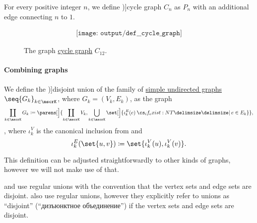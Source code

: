 \begin{definition}\label{def:cycle_graph}
  For every positive integer \( n \), we define \term[en=cycle graph (\cite[532]{Rosen1999})]{cycle graph} \( C_n \) as \hyperref[def:path_graph]{\( P_n \)} with an additional edge connecting \( n \) to \( 1 \).

  \begin{figure}[!ht]
    \begin{equation}\label{eq:fig:def:cycle_graph/c12}
      \begin{aligned}
        \texttt{[image: output/def\_\_cycle\_graph]}
      \end{aligned}
    \end{equation}
    \caption{The graph \hyperref[def:cycle_graph]{cycle graph} \( C_{12} \).}\label{fig:def:cycle_graph/c12}
  \end{figure}
\end{definition}

\paragraph{Combining graphs}

\begin{definition}\label{def:graph_disjoint_union}\mimprovised
  We define the \term[ru=дизъюнктное объедиение (графов) (\cite[19]{Емеличев1990})]{disjoint union} of the family of \hyperref[def:undirected_graph]{simple undirected graphs} \( \seq{ G_k }_{k \in \mscrK} \), where \( G_k = (V_k, E_k) \), as the graph
  \begin{equation*}
    \coprod_{k \in \mscrK} G_k \coloneqq \parens[\Big]{ \coprod_{k \in \mscrK} V_k, \bigcup_{k \in \mscrK} \set[\Big]{ \iota_k^E(e) \given* e \in E_k } },
  \end{equation*},
  where \( \iota_k^V \) is the canonical inclusion from  and
  \begin{equation*}
    \iota_k^E(\set{ u, v }) \coloneqq \set{ \iota_k^V(u), \iota_k^V(v) }.
  \end{equation*}
\end{definition}
\begin{comments}
  \item This definition can be adjusted straightforwardly to other kinds of graphs, however we will not make use of that.
  \item {} and  use regular unions with the convention that the vertex sets and edge sets are disjoint.  also use regular unions, however they explicitly refer to unions as \enquote{disjoint} (\enquote{дизъюнктное объединение}) if the vertex sets and edge sets are disjoint.
\end{comments}

